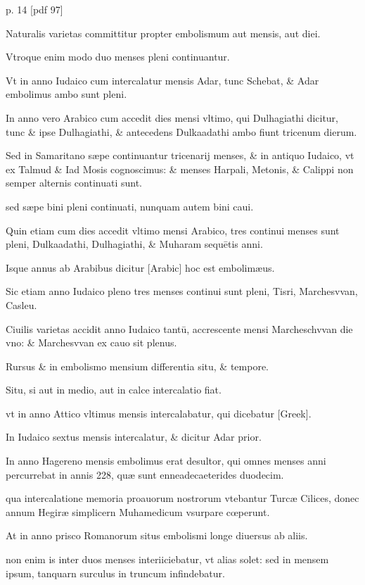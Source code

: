 p. 14 [pdf 97]


Naturalis varietas committitur propter embolismum
aut mensis, aut diei.

Vtroque enim modo duo menses pleni continuantur.

Vt in anno Iudaico cum intercalatur mensis Adar, tunc
Schebat, \& Adar embolimus ambo sunt pleni.

In anno vero Arabico
cum accedit dies mensi vltimo, qui Dulhagiathi dicitur, tunc \& ipse
Dulhagiathi, \& antecedens Dulkaadathi ambo fiunt tricenum dierum.

Sed in Samaritano sæpe continuantur tricenarij menses, \& in antiquo
Iudaico, vt ex Talmud \& Iad Mosis cognoscimus: \& menses Harpali,
Metonis, \& Calippi non semper alternis continuati sunt.

sed sæpe bini
pleni continuati, nunquam autem bini caui.

Quin etiam cum dies accedit
vltimo mensi Arabico, tres continui menses sunt pleni, Dulkaadathi,
Dulhagiathi, \& Muharam sequētis anni.

Isque annus ab Arabibus
dicitur \textarabic{[Arabic]} hoc est embolimæus.

Sic etiam anno Iudaico pleno
tres menses continui sunt pleni, Tisri, Marchesvvan, Casleu.

Ciuilis
varietas accidit anno Iudaico tantū, accrescente mensi Marcheschvvan
die vno: \& Marchesvvan ex cauo sit plenus.

Rursus \& in embolismo
mensium differentia situ, \& tempore.

Situ, si aut in medio, aut in calce
intercalatio fiat.

vt in anno Attico vltimus mensis intercalabatur, qui
dicebatur \textgreek{[Greek]}.

In Iudaico sextus mensis intercalatur, \&
dicitur Adar prior.

In anno Hagereno mensis embolimus erat desultor,
qui omnes menses anni percurrebat in annis 228, quæ sunt enneadecaeterides
duodecim.

qua intercalatione memoria proauorum nostrorum
vtebantur Turcæ Cilices, donec annum Hegiræ simplicern 
Muhamedicum vsurpare cœperunt.

At in anno prisco Romanorum
situs embolismi longe diuersus ab aliis.

non enim is inter duos
menses interiiciebatur, vt alias solet: sed in mensem ipsum, tanquarn
surculus in truncum infindebatur.

